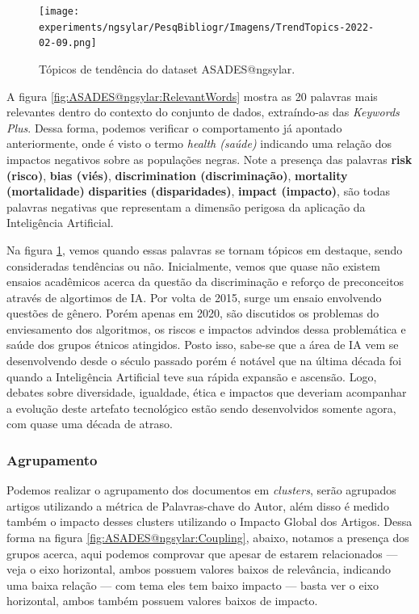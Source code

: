 \begin{figure}[H]
    \centering
\texttt{[image: experiments/ngsylar/PesqBibliogr/Imagens/TrendTopics-2022-02-09.png]}
    \caption{Tópicos de tendência do dataset ASADES@ngsylar.}
    \label{fig:ASADES@ngsylar:TT}
\end{figure}

A figura \ref{fig:ASADES@ngsylar:RelevantWords} mostra as 20 palavras mais relevantes dentro do contexto do conjunto de dados, extraíndo-as das \textit{Keywords Plus}. Dessa forma, podemos verificar o comportamento já apontado anteriormente, onde é visto o termo \textit{health (saúde)} indicando uma relação dos impactos negativos sobre as populações negras. Note a presença das palavras \textbf{risk (risco)}, \textbf{bias (viés)}, \textbf{discrimination (discriminação)}, \textbf{mortality (mortalidade)} \textbf{disparities (disparidades)}, \textbf{impact (impacto)}, são todas palavras negativas que representam a dimensão perigosa da aplicação da Inteligência Artificial.

Na figura \ref{fig:ASADES@ngsylar:TT}, vemos quando essas palavras se tornam tópicos em destaque, sendo consideradas tendências ou não. Inicialmente, vemos que quase não existem ensaios acadêmicos acerca da questão da discriminação e reforço de preconceitos através de algortimos de IA. Por volta de 2015, surge um ensaio envolvendo questões de gênero. Porém apenas em 2020, são discutidos os problemas do enviesamento dos algoritmos, os riscos e impactos advindos dessa problemática e saúde dos grupos étnicos atingidos. Posto isso, sabe-se que a área de IA vem se desenvolvendo desde o século passado porém é notável que na última década foi quando a Inteligência Artificial teve sua rápida expansão e ascensão. Logo, debates sobre diversidade, igualdade, ética e impactos que deveriam acompanhar a evolução deste artefato tecnológico estão sendo desenvolvidos somente agora, com quase uma década de atraso. 


\subsubsection{Agrupamento}

Podemos realizar o agrupamento dos documentos em \textit{clusters}, serão agrupados artigos utilizando a métrica de Palavras-chave do Autor, além disso é medido também o impacto desses clusters utilizando o Impacto Global dos Artigos. Dessa forma na figura \ref{fig:ASADES@ngsylar:Coupling}, abaixo, notamos a presença dos grupos acerca, aqui podemos comprovar que apesar de estarem relacionados --- veja o eixo horizontal, ambos possuem valores baixos de relevância, indicando uma baixa relação --- com tema eles tem baixo impacto --- basta ver o eixo horizontal, ambos também possuem valores baixos de impacto.

